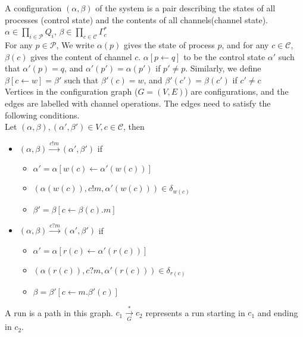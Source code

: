\documentclass[a4paper,UKenglish,cleveref, autoref, thm-restate]{lipics-v2019}
\begin{document}
\hspace*{1cm}A configuration $(\alpha, \beta)$ of the system is a pair describing the states of all processes (control state) and the contents of all channels(channel state). \\
\hspace*{5cm} ${\displaystyle \alpha \in \prod_{i \in \mathcal{P}} Q_i}$, ${\displaystyle \beta \in \prod_{c \in \mathcal{C}} \Gamma_c^*}$\\
\hspace*{1cm}For any $p \in \mathcal{P}$, We write $\alpha(p)$ gives the state of process $p$, and for any $c \in \mathcal{C}$, $\beta(c)$ gives the content of channel $c$. $\alpha[p \leftarrow q]$ to be the control state  $\alpha'$ such that $\alpha'(p) = q$, and $\alpha'(p') = \alpha(p')$ if $p' \neq p$. Similarly, we define $\beta[c \leftarrow w]= \beta'$ such that $\beta'(c) = w$, and $\beta'(c') = \beta(c')$ if $c' \neq c$\\
\hspace*{1cm}Vertices in the configuration graph ($G = (V, E)$) are configurations, and the edges are labelled with channel operations. The edges need to satisfy the following conditions. \\
Let $(\alpha, \beta), (\alpha', \beta') \in V, c \in \mathcal{C}$, then 
\begin{itemize}
\item $(\alpha, \beta) \xrightarrow{c!m} (\alpha', \beta')$ if
\begin{itemize}
    \item $\alpha' = \alpha[w(c) \leftarrow \alpha'(w(c))]$
    \item $(\alpha(w(c)), c!m, \alpha'(w(c))) \in \delta_{w(c)}$
    \item $\beta' = \beta[c \leftarrow \beta(c).m]$

\end{itemize}


\item $(\alpha, \beta) \xrightarrow{c?m} (\alpha', \beta')$ if
\begin{itemize}
    \item $\alpha' = \alpha[r(c) \leftarrow \alpha'(r(c))]$
    \item $(\alpha(r(c)), c?m, \alpha'(r(c))) \in \delta_{r(c)}$
    \item $\beta = \beta'[c \leftarrow m.\beta'(c)]$

\end{itemize}
\end{itemize}
\hspace*{1cm}A run is a path in this graph. $c_1 \xrightarrow[G]{*} c_2 $ represents a run starting in $c_1$ and ending in $c_2$.
\end{document}
